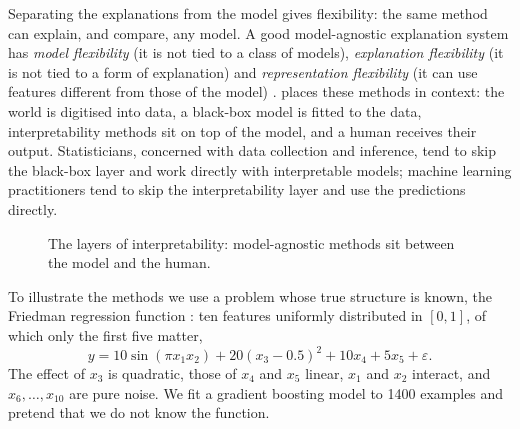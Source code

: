 Separating the explanations from the model gives flexibility: the same method can explain, and
compare, any model. A good model-agnostic explanation system has \emph{model flexibility} (it is not
tied to a class of models), \emph{explanation flexibility} (it is not tied to a form of explanation)
and \emph{representation flexibility} (it can use features different from those of the model)
\citep{ribeiro2016model}.  places these methods in context: the world is digitised
into data, a black-box model is fitted to the data, interpretability methods sit on top of the model,
and a human receives their output. Statisticians, concerned with data collection and inference, tend
to skip the black-box layer and work directly with interpretable models; machine learning
practitioners tend to skip the interpretability layer and use the predictions directly.

\begin{figure}[htbp]
\centering
{}
\caption{The layers of interpretability: model-agnostic methods sit between the model and the
human.}
\label{fig:layers}
\end{figure}

To illustrate the methods we use a problem whose true structure is known, the Friedman regression
function \citep{friedman1991multivariate}: ten features uniformly distributed in $[0,1]$, of which
only the first five matter,
\begin{equation}\label{eq:friedman}
  y=10\sin(\pi x_1x_2)+20(x_3-0.5)^2+10x_4+5x_5+\varepsilon .
\end{equation}
The effect of $x_3$ is quadratic, those of $x_4$ and $x_5$ linear, $x_1$ and $x_2$ interact, and
$x_6,\dots,x_{10}$ are pure noise. We fit a gradient boosting model to 1400 examples and pretend that
we do not know the function.

